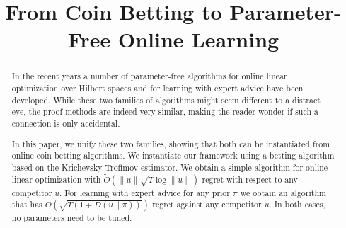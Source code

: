 \documentclass{colt2016} %
\title{From Coin Betting to Parameter-Free Online Learning}
\newcommand{\KL}[2]{D({#1}\|{#2})}  %
\begin{document}
\maketitle

\begin{abstract}
In the recent years a number of parameter-free algorithms for online linear
optimization over Hilbert spaces and for learning with expert advice have been
developed. While these two families of algorithms might seem different to a
distract eye, the proof methods are indeed very similar, making the reader
wonder if such a connection is only accidental.

In this paper, we unify these two families, showing that both can be
instantiated from online coin betting algorithms. We instantiate our framework
using a betting algorithm based on the Krichevsky-Trofimov estimator. We obtain
a simple algorithm for online linear optimization with $\widetilde
O(\|u\|\sqrt{T \log\|u\|})$ regret with respect to any competitor $u$. For
learning with expert advice for any prior $\pi$ we obtain an algorithm that has
$O(\sqrt{T (1 + \KL{u}{\pi})})$ regret against any competitor $u$. In both
cases, no parameters need to be tuned.
\end{abstract}










\appendix
\end{document}
